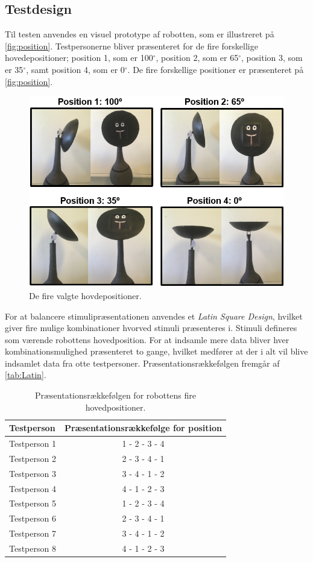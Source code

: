 \subsection*{Testdesign}
%
Til testen anvendes en visuel prototype af robotten, som er illustreret på \autoref{fig:position}. Testpersonerne bliver præsenteret for de fire forskellige hovedepositioner; position 1, som er 100$^{\circ}$, position 2, som er 65$^{\circ}$, position 3, som er 35$^{\circ}$, samt position 4, som er 0$^{\circ}$. De fire forskellige positioner er præsenteret på \autoref{fig:position}.   
%
\begin{figure}[H]
\centering
\includegraphics[width = \textwidth]{Figure/positionerBilleder.PNG} 
\caption{De fire valgte hovdepositioner.}
\label{fig:position}
\end{figure}
\noindent 
%
For at balancere stimulipræsentationen anvendes et \textit{Latin Square Design}, hvilket giver fire mulige kombinationer hvorved stimuli præsenteres i. Stimuli defineres som værende robottens hovedposition. For at indsamle mere data bliver hver kombinationsmulighed præsenteret to gange, hvilket medfører at der i alt vil blive indsamlet data fra otte testpersoner. Præsentationsrækkefølgen fremgår af \autoref{tab:Latin}.  
%
\begin{table}[H]
	\centering
	\begin{tabular}{l|c}
		Testperson     & Præsentationsrækkefølge for position \\\hline
		Testperson 1   & 1 - 2 - 3 - 4          \\\hline
		Testperson 2   & 2 - 3 - 4 - 1          \\\hline
		Testperson 3   & 3 - 4 - 1 - 2          \\\hline
		Testperson 4   & 4 - 1 - 2 - 3          \\\hline
		Testperson 5   & 1 - 2 - 3 - 4          \\\hline
		Testperson 6   & 2 - 3 - 4 - 1          \\\hline
		Testperson 7   & 3 - 4 - 1 - 2          \\\hline
		Testperson 8   & 4 - 1 - 2 - 3   
	\end{tabular}
	\caption{Præsentationsrækkefølgen for robottens fire hovedpositioner.}
	\label{tab:Latin}         
\end{table}
